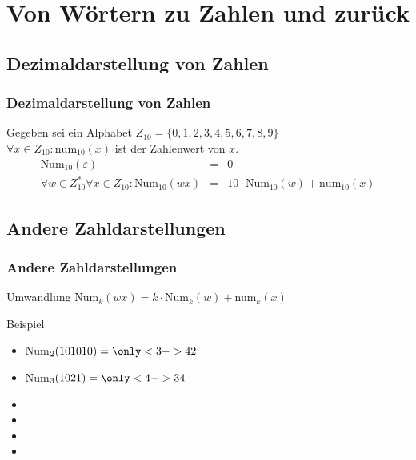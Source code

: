 \section{Von Wörtern zu Zahlen und zurück}
\subsection{Dezimaldarstellung von Zahlen}
\begin{frame}
	\frametitle{Dezimaldarstellung von Zahlen}
	\begin{definition}
		Gegeben sei ein Alphabet $Z_{10}=\{0,1,2,3,4,5,6,7,8,9\}$\\
		\vspace{.5cm}
		$\forall x\in Z_{10}:\text{num}_{10}(x)$ ist der Zahlenwert von $x$.
		\pause
		\begin{eqnarray*}
			\text{Num}_{10}(\varepsilon)&=&0\\
			\forall w\in Z_{10}^* \forall x\in Z_{10}: \text{Num}_{10}(wx)&=&10\cdot \text{Num}_{10}(w)+\text{num}_{10}(x)
		\end{eqnarray*}
	\end{definition}
\end{frame}

\subsection{Andere Zahldarstellungen}
\begin{frame}
	\frametitle{Andere Zahldarstellungen}
	\begin{block}{Umwandlung}
		Num$_k(wx)=k\cdot$Num$_k(w)+$num$_k(x)$
	\end{block}
	\pause
	\begin{exampleblock}{Beispiel}
		\begin{itemize}
			\item Num$_2(101010)=\only<3->{42}$
			\item Num$_3(1021)=\only<4->{34}$
			\item {}
			\item {}
			\item {}
			\item {}
		\end{itemize}

	\end{exampleblock}
\end{frame}

